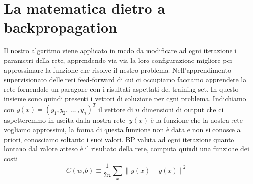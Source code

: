\section{La matematica dietro a backpropagation}
Il nostro algoritmo viene applicato in modo da modificare ad ogni iterazione i parametri della rete, apprendendo via via la loro configurazione migliore per approssimare la funzione che risolve il nostro problema. Nell'apprendimento supervisionato delle reti feed-forward di cui ci occupiamo facciamo apprendere la rete fornendole un paragone con i risultati aspettati del training set. In questo insieme sono quindi presenti i vettori di soluzione per ogni problema. Indichiamo con $ y(x)=(y_{1}, y_{2},\, \dots \, , y_{n})^{T} $ il vettore di $n$ dimensioni di output che ci aspetteremmo in uscita dalla  nostra rete; $y(x)$ è la funzione che la nostra rete vogliamo approssimi, la forma di questa funzione non è data e non si conosce a priori, conosciamo soltanto i suoi valori. BP valuta ad ogni iterazione quanto lontano dal valore atteso è il risultato della rete, computa quindi una funzione dei costi
\begin{equation}
	C(w,b)\equiv\frac{1}{2n}\sum_{x} \parallel y(x)-\hat{y}(x)\parallel^{2}
\end{equation} 


